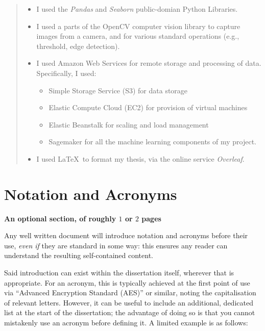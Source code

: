 \documentclass[ %
                    author={Ashrey Ashrey, Sanya Kapoor, Trisha Sharma, Yash Bhooshan Pandloskar},
                supervisor={Dr. Dalila O’Grady},
                    degree={MSc},
                     title={Using machine learning to forecast physical activity participation, volunteering and activity patterns in London},
                  subtitle={},
                      type={},
                      year={2021}]{dissertation}
\begin{document}
\begin{quote}
\noindent
\begin{itemize}

\item I used the {\em Pandas} and {\em Seaborn} public-domian Python Libraries. 

\item I used a parts of the OpenCV computer vision library to capture 
      images from a camera, and for various standard operations (e.g., 
      threshold, edge detection).

\item I used Amazon Web Services for remote storage and processing of data. Specifically, I used:
 \begin{itemize}
 \item Simple Storage Service (S3) for data storage
 \item Elastic Compute Cloud (EC2) for provision of virtual machines
 \item Elastic Beanstalk for scaling and load management
 \item Sagemaker for all the machine learning components of my project. 
 \end{itemize}
 
\item I used \LaTeX\ to format my thesis, via the online service {\em Overleaf}. 
\end{itemize}
\end{quote}


\chapter*{Notation and Acronyms}

{\bf An optional section, of roughly $1$ or $2$ pages}
\vspace{1cm} 

\noindent
Any well written document will introduce notation and acronyms before
their use, {\em even if} they are standard in some way: this ensures 
any reader can understand the resulting self-contained content.  

Said introduction can exist within the dissertation itself, wherever 
that is appropriate.  For an acronym, this is typically achieved at 
the first point of use via ``Advanced Encryption Standard (AES)'' or 
similar, noting the capitalisation of relevant letters.  However, it 
can be useful to include an additional, dedicated list at the start 
of the dissertation; the advantage of doing so is that you cannot 
mistakenly use an acronym before defining it.  A limited example is 
as follows:
\end{document}
